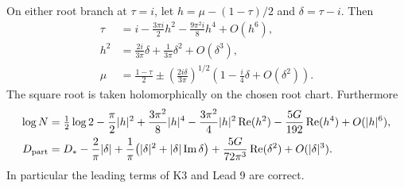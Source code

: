 \begin{statement}
On either root branch at $\tau=i$, let
$h=\mu-(1-\tau)/2$ and $\delta=\tau-i$. Then
\begin{align*}
 \tau&=i-\frac{3\pi i}{2}h^2-\frac{9\pi^2i}{8}h^4+O(h^6),\\
 h^2&=\frac{2i}{3\pi}\delta+\frac1{3\pi}\delta^2+O(\delta^3),\\
 \mu&=\frac{1-\tau}{2}
  \mathbin{\pm}\left(\frac{2i\delta}{3\pi}\right)^{1/2}
          \left(1-\frac{i}{4}\delta+O(\delta^2)\right).
\end{align*}
The square root is taken holomorphically on the chosen root chart.
Furthermore
\begin{align}\label{eq:cs-Li}
 \log N={}&\tfrac12\log2-\frac\pi2|h|^2
   +\frac{3\pi^2}{8}|h|^4
   -\frac{3\pi^2}{4}|h|^2\operatorname{Re}(h^2)
   -\frac{5G}{192}\operatorname{Re}(h^4)+O(|h|^6),\\
 D_{\rm part}={}&D_* -\frac2\pi|\delta|
  +\frac1\pi\bigl(|\delta|^2+|\delta|\operatorname{Im}\delta\bigr)
  +\frac{5G}{72\pi^3}\operatorname{Re}(\delta^2)
  +O(|\delta|^3).\nonumber
\end{align}
In particular the leading terms of K3 and Lead 9 are correct.
\end{statement}
